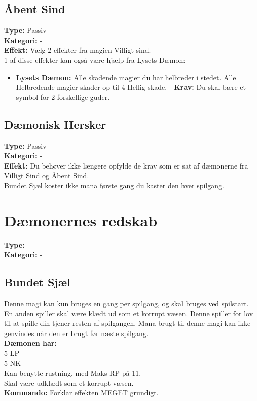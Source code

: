 \subsection{Åbent Sind}
\textbf{Type:} Passiv\\
\textbf{Kategori:} -\\
\textbf{Effekt:} Vælg 2 effekter fra magien Villigt sind.\\
1 af disse effekter kan også være hjælp fra Lysets Dæmon:
\begin{itemize}
    \item \textbf{Lysets Dæmon:} Alle skadende magier du har helbreder i stedet. Alle Helbredende magier skader op til 4 Hellig skade. - \textbf{Krav:} Du skal bære et symbol for 2 forskellige guder.
\end{itemize}

\subsection{Dæmonisk Hersker}
\textbf{Type:} Passiv\\
\textbf{Kategori:} -\\
\textbf{Effekt:} Du behøver ikke længere opfylde de krav som er sat af dæmonerne fra Villigt Sind og Åbent Sind.\\
Bundet Sjæl koster ikke mana første gang du kaster den hver spilgang.

\section{Dæmonernes redskab}
\textbf{Type:} -\\
\textbf{Kategori:} -\\

\subsection{Bundet Sjæl}
Denne magi kan kun bruges en gang per spilgang, og skal bruges ved spilstart. En anden spiller skal være klædt ud som et korrupt væsen. Denne spiller for lov til at spille din tjener resten af spilgangen. Mana brugt til denne magi kan ikke genvindes når den er brugt før næste spilgang.\\
\textbf{Dæmonen har:}\\
5 LP\\ 
5 NK\\
Kan benytte rustning, med Maks RP på 11.\\
Skal være udklædt som et korrupt væsen.\\
\textbf{Kommando:} Forklar effekten MEGET grundigt.

